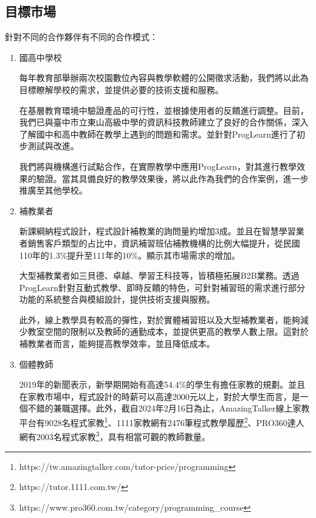 

\newpage
\subsection{目標市場} %

針對不同的合作夥伴有不同的合作模式：

\begin{enumerate}
  \setlength{\parindent}{2em}
  
  \item 國高中學校
  \par 每年教育部舉辦兩次校園數位內容與教學軟體的公開徵求活動，我們將以此為目標瞭解學校的需求，並提供必要的技術支援和服務。
  \par 在基層教育環境中驗證產品的可行性，並根據使用者的反饋進行調整。目前，我們已與臺中市立東山高級中學的資訊科技教師建立了良好的合作關係，深入了解國中和高中教師在教學上遇到的問題和需求。並針對ProgLearn進行了初步測試與改進。
  \par 我們將與機構進行試點合作，在實際教學中應用ProgLearn，對其進行教學效果的驗證。當其具備良好的教學效果後，將以此作為我們的合作案例，進一步推廣至其他學校。
  \item 補教業者
  \par 新課綱納程式設計，程式設計補教業的詢問量約增加3成\cite{ref:補教業者}。並且在智慧學習業者銷售客戶類型的占比中，資訊補習班佔補教機構的比例大幅提升，從民國110年的1.3\%提升至111年的10\%\cite{ref:110產業產值調查報告}\cite{ref:111產業產值調查報告}。顯示其市場需求的增加。
  \par 大型補教業者如三貝德、卓越、學習王科技等，皆積極拓展B2B業務。透過ProgLearn針對互動式教學、即時反饋的特色，可針對補習班的需求進行部分功能的系統整合與模組設計，提供技術支援與服務。
  \par 此外，線上教學具有較高的彈性，對於實體補習班以及大型補教業者，能夠減少教室空間的限制以及教師的通勤成本，並提供更高的教學人數上限。這對於補教業者而言，能夠提高教學效率，並且降低成本。
  \item 個體教師
  \par 2019年的新聞表示，新學期開始有高達54.4\%的學生有擔任家教的規劃\cite{ref:家教}。並且在家教市場中，程式設計的時薪可以高達2000元以上\cite{ref:學生數量}，對於大學生而言，是一個不錯的兼職選擇。此外，截自2024年2月16日為止，AmazingTalker線上家教平台有9028名程式家教\footnote{https://tw.amazingtalker.com/tutor-price/programming}、1111家教網有2476筆程式教學履歷\footnote{https://tutor.1111.com.tw/}、PRO360達人網有2003名程式家教\footnote{https://www.pro360.com.tw/category/programming\_course}，具有相當可觀的教師數量。

\end{enumerate}
